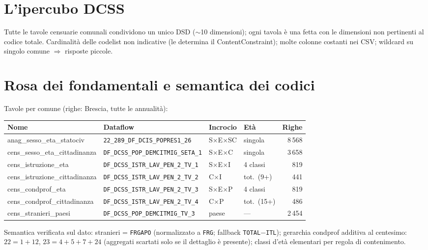 \documentclass[11pt,a4paper]{article}
\newcommand{\code}[1]{\texttt{#1}}
\newcommand{\flow}[1]{\texttt{\small #1}}
\begin{document}
\section{L'ipercubo DCSS}
Tutte le tavole censuarie comunali condividono un unico DSD ($\sim$10
dimensioni); ogni tavola \`e una fetta con le dimensioni non pertinenti al
codice totale. Cardinalit\`a delle codelist non indicative (le determina il
ContentConstraint); molte colonne costanti nei CSV; wildcard su singolo comune
$\Rightarrow$ risposte piccole.

\section{Rosa dei fondamentali e semantica dei codici}
Tavole per comune (righe: Brescia, tutte le annualit\`a):
\begin{center}
\small
\begin{tabular}{@{}llllr@{}}
\toprule
\textbf{Nome} & \textbf{Dataflow} & \textbf{Incrocio} & \textbf{Et\`a} & \textbf{Righe}\\
\midrule
anag\_sesso\_eta\_statociv & \flow{22\_289\_DF\_DCIS\_POPRES1\_26} & S$\times$E$\times$SC & singola & 8\,568\\
cens\_sesso\_eta\_cittadinanza & \flow{DF\_DCSS\_POP\_DEMCITMIG\_SETA\_1} & S$\times$E$\times$C & singola & 3\,658\\
cens\_istruzione\_eta & \flow{DF\_DCSS\_ISTR\_LAV\_PEN\_2\_TV\_1} & S$\times$E$\times$I & 4 classi & 819\\
cens\_istruzione\_cittadinanza & \flow{DF\_DCSS\_ISTR\_LAV\_PEN\_2\_TV\_2} & C$\times$I & tot.\ (9+) & 441\\
cens\_condprof\_eta & \flow{DF\_DCSS\_ISTR\_LAV\_PEN\_2\_TV\_3} & S$\times$E$\times$P & 4 classi & 819\\
cens\_condprof\_cittadinanza & \flow{DF\_DCSS\_ISTR\_LAV\_PEN\_2\_TV\_4} & C$\times$P & tot.\ (15+) & 486\\
cens\_stranieri\_paesi & \flow{DF\_DCSS\_POP\_DEMCITMIG\_TV\_3} & paese & --- & 2\,454\\
\bottomrule
\end{tabular}
\end{center}
Semantica verificata sul dato: stranieri = \code{FRGAPO} (normalizzato a
\code{FRG}; fallback \code{TOTAL}$-$\code{ITL}); gerarchia condprof additiva al
centesimo: $22 = 1+12$, $23 = 4+5+7+24$ (aggregati scartati solo se il
dettaglio \`e presente); classi d'et\`a elementari per regola di contenimento.
\end{document}
